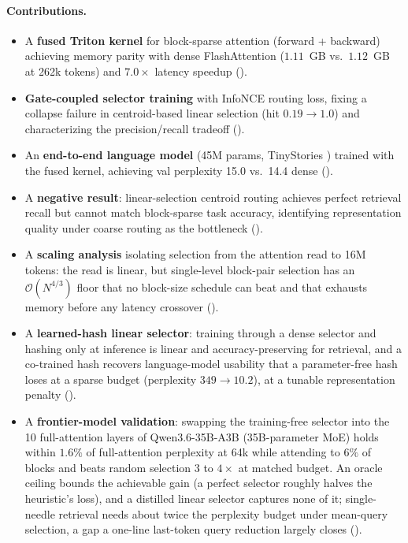 \documentclass[10pt,letterpaper]{article}
\newcommand{\Ocomplex}{\mathcal{O}}
\begin{document}
\paragraph{Contributions.}
\begin{itemize}[leftmargin=*,itemsep=2pt]
\item A \textbf{fused Triton kernel} for block-sparse attention (forward +
  backward) achieving memory parity with dense FlashAttention
  ($1.11$~GB vs.\ $1.12$~GB at 262k tokens) and $7.0\times$ latency speedup
  ().
\item \textbf{Gate-coupled selector training} with InfoNCE routing loss,
  fixing a collapse failure in centroid-based linear selection
  (hit $0.19 \to 1.0$) and characterizing the precision/recall tradeoff
  ().
\item An \textbf{end-to-end language model} (45M params, TinyStories
  \cite{eldan2023tinystories}) trained with the fused kernel, achieving val
  perplexity 15.0 vs.\ 14.4 dense ().
\item A \textbf{negative result}: linear-selection centroid routing achieves
  perfect retrieval recall but cannot match block-sparse task accuracy,
  identifying representation quality under coarse routing as the bottleneck
  ().
\item A \textbf{scaling analysis} isolating selection from the attention read
  to 16M tokens: the read is linear, but single-level block-pair selection has
  an $\Ocomplex(N^{4/3})$ floor that no block-size schedule can beat and that
  exhausts memory before any latency crossover ().
\item A \textbf{learned-hash linear selector}: training through a dense selector
  and hashing only at inference is linear and accuracy-preserving for retrieval,
  and a co-trained hash recovers language-model usability that a parameter-free
  hash loses at a sparse budget (perplexity $349 \to 10.2$), at a tunable
  representation penalty ().
\item A \textbf{frontier-model validation}: swapping the training-free selector into
  the 10 full-attention layers of Qwen3.6-35B-A3B (35B-parameter MoE) holds within
  $1.6\%$ of full-attention perplexity at 64k while attending to $6\%$ of blocks and
  beats random selection $3$ to $4\times$ at matched budget. An oracle ceiling bounds
  the achievable gain (a perfect selector roughly halves the heuristic's loss), and a
  distilled linear selector captures none of it; single-needle retrieval needs about
  twice the perplexity budget under mean-query selection, a gap a one-line last-token
  query reduction largely closes ().
\end{itemize}
\end{document}

